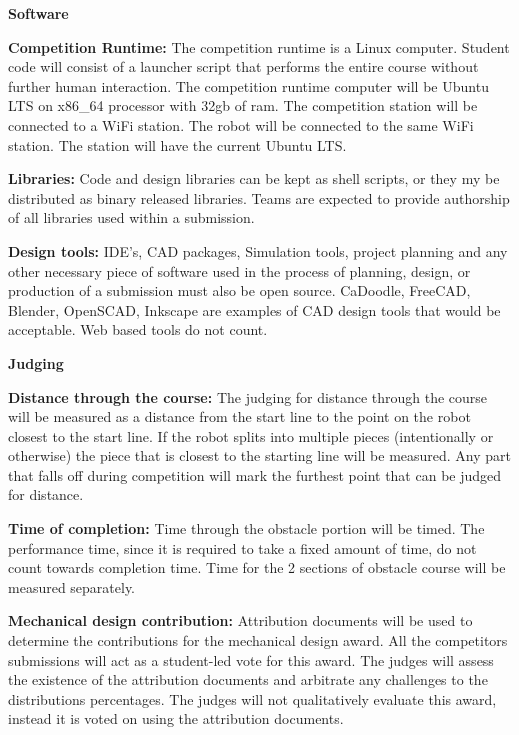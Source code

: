 \documentclass{article}
\begin{document}
 \pagebreak

{\huge \textbf{Software}}

\textbf{Competition Runtime:} The competition runtime is a Linux computer. Student code will consist of a launcher script that performs the entire course without further human interaction. The competition runtime computer will be Ubuntu LTS on x86\_64 processor with 32gb of ram. The competition station will be connected to a WiFi station. The robot will be connected to the same WiFi station. The station will have the current Ubuntu LTS.  

\textbf{Libraries:} Code and design libraries can be kept as shell scripts, or they my be distributed as binary released libraries. Teams are expected to provide authorship of all libraries used within a submission. 

\textbf{Design tools:} IDE's, CAD packages, Simulation tools, project planning and any other necessary piece of software used in the process of planning, design, or production of a submission must also be open source. CaDoodle, FreeCAD, Blender, OpenSCAD, Inkscape are examples of CAD design tools that would be acceptable. Web based tools do not count.  


\vspace{1cm}

 \pagebreak

{\huge \textbf{Judging}}

\textbf{Distance through the course:} The judging for distance through the course will be measured as a distance from the start line to the point on the robot closest to the start line. If the robot splits into multiple pieces (intentionally or otherwise) the piece that is closest to the starting line will be measured. Any part that falls off during competition will mark the furthest point that can be judged for distance.  
 	
\textbf{Time of completion:} Time through the obstacle portion will be timed. The performance time, since it is required to take a fixed amount of time, do not count towards completion time. Time for the 2 sections of obstacle course will be measured separately.  
 	
 \textbf{Mechanical design contribution:} Attribution documents will be used to determine the contributions for the mechanical design award. All the competitors submissions will act as a student-led vote for this award. The judges will assess the existence of the  attribution documents and arbitrate any challenges to the distributions percentages. The judges will not qualitatively evaluate this award, instead it is voted on using the attribution documents. 
 	
\end{document}
